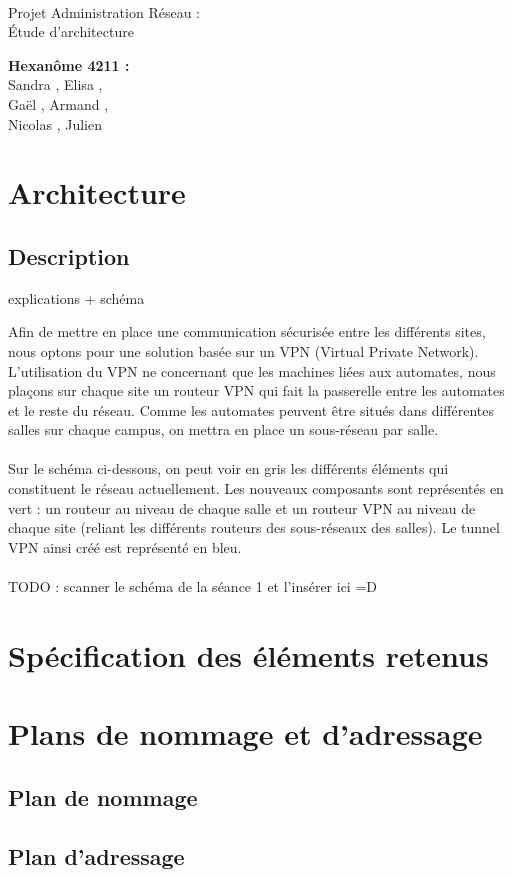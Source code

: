 \documentclass[a4paper]{article}
\begin{document}
\begin{titlepage}
	~ 
	\vfill
	\begin{center}
		\begin{Huge}
			Projet Administration Réseau : \\ Étude d'architecture\\
		\end{Huge}
	\vfill
		\textbf{Hexanôme 4211 :} 
			\\Sandra {}, Elisa , 
			\\Gaël , Armand , 
			\\Nicolas {}, Julien \\
	\vfill
	\end{center}
	\vfill
\end{titlepage}

\newpage
\tableofcontents
\newpage

\section{Architecture}
	\subsection{Description}
	explications + schéma 
	
	Afin de mettre en place une communication sécurisée entre les différents sites, nous optons pour une solution basée sur un VPN (Virtual Private Network). L'utilisation du VPN ne concernant que les machines liées aux automates, nous plaçons sur chaque site un routeur VPN qui fait la passerelle entre les automates et le reste du réseau. Comme les automates peuvent être situés dans différentes salles sur chaque campus, on mettra en place un sous-réseau par salle. 
	\paragraph*{}
	Sur le schéma ci-dessous, on peut voir en gris les différents éléments qui constituent le réseau actuellement. Les nouveaux composants sont représentés en vert : un routeur au niveau de chaque salle et un routeur VPN au niveau de chaque site (reliant les différents routeurs des sous-réseaux des salles). Le tunnel VPN ainsi créé est représenté en bleu. 
	\paragraph*{}
	TODO : scanner le schéma de la séance 1 et l'insérer ici =D 
	
\section{Spécification des éléments retenus}

	
\section{Plans de nommage et d'adressage}
	\subsection{Plan de nommage}
	\subsection{Plan d'adressage}

	
\end{document}
